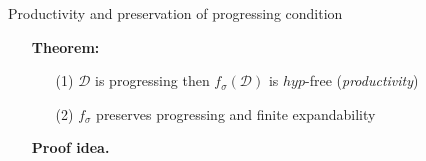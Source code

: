 \documentclass[10pt]{beamer}
\theoremstyle{definition}
\theoremstyle{plain}
\newcommand{\red}[1]{{\color{red}#1}}
\newcommand{\green}[1]{{\color{mygreen}#1}}
\renewcommand{\red}{\alert}
\newcommand{\zero}{hyp}
\newcommand{\vldr}[2]{\vltr{#1}{#2}{\vlhy{\ }}{\vlhy{\ }}{\vlhy{\ }}}
\newcommand{\cneg}[1]{{#1}^\perp }
\newcommand{\der}{\mathcal{D}}
\begin{document}
\begin{frame}{Productivity and preservation of progressing condition}
	\begin{itemize}
		\item[]\red{\textbf{Theorem:}} 
		\smallskip
		\begin{itemize}
			\item[(1)]   $\der$ is progressing then $f_\sigma (\der)$ is $\zero$-free (\emph{productivity})
			\smallskip
			\item[(2)]  $f_\sigma$ preserves progressing and finite expandability 
		\end{itemize}
		\medskip\pause 
		\item[] \textbf{Proof idea.}  

\end{itemize}
\end{frame}
\end{document}
